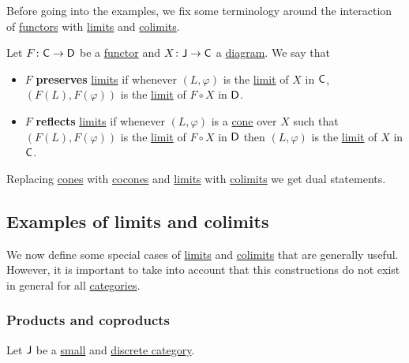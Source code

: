 \documentclass[../../main]{subfiles}
\begin{document}
Before going into the examples, we fix some terminology around the interaction of \hyperref[def:functor]{functors} with \hyperref[def:categorical-limit]{limits} and \hyperref[def:categorical-colimit]{colimits}.

\begin{definition}\label{def:functor-and-limits}
  Let \(F\colon \mathsf{C} \to \mathsf{D}\) be a \hyperref[def:functor]{functor} and \(X\colon \mathsf{J} \to \mathsf{C}\) a \hyperref[def:diagram]{diagram}.
  We say that
  \begin{itemize}
    \item \(F\) \textbf{preserves} \hyperref[def:categorical-limit]{limits} if whenever \((L, \varphi)\) is the \hyperref[def:categorical-limit]{limit} of \(X\) in \(\mathsf{C}\), \((F(L), F(\varphi))\) is the \hyperref[def:categorical-limit]{limit} of \(F \circ X\) in \(\mathsf{D}\).
    \item \(F\) \textbf{reflects} \hyperref[def:categorical-limit]{limits} if whenever \((L, \varphi)\) is a \hyperref[def:cone]{cone} over \(X\) such that \((F(L), F(\varphi))\) is the \hyperref[def:categorical-limit]{limit} of \(F \circ X\) in \(\mathsf{D}\) then \((L, \varphi)\) is the \hyperref[def:categorical-limit]{limit} of \(X\) in \(\mathsf{C}\).
  \end{itemize}

  Replacing \hyperref[def:cone]{cones} with \hyperref[def:cocone]{cocones} and \hyperref[def:categorical-limit]{limits} with \hyperref[def:categorical-colimit]{colimits} we get dual statements.
\end{definition}

\subsection{Examples of limits and colimits}

We now define some special cases of \hyperref[def:categorical-limit]{limits} and \hyperref[def:categorical-colimit]{colimits} that are generally useful.
However, it is important to take into account that this constructions do not exist in general for all \hyperref[def:category]{categories}.

\subsubsection{Products and coproducts}

Let \(\mathsf{J}\) be a \hyperref[def:small-category]{small} and \hyperref[ex:discrete-category]{discrete category}.
\end{document}

